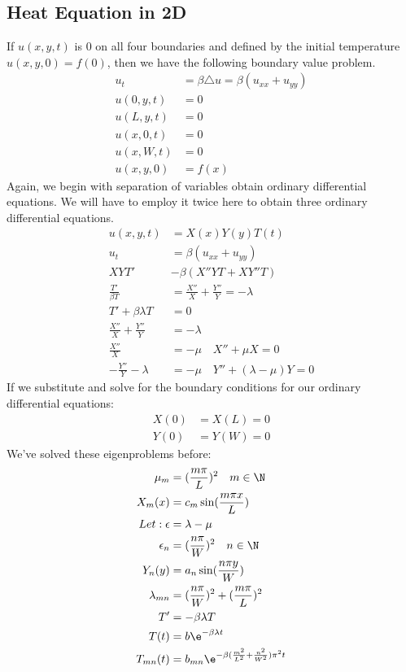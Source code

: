 \documentclass{math}
\begin{document}
\subsection*{Heat Equation in 2D}
\begin{center}
\end{center}
If \( u(x,y,t) \) is 0 on all four boundaries and defined by the initial
temperature \( u(x,y,0) = f(0) \), then we have the following boundary
value problem.
\begin{align*}
  u_t &= \beta\triangle u = \beta(u_{xx}+u_{yy}) \\
  u(0,y,t) &= 0 \\
  u(L,y,t) &= 0 \\
  u(x,0,t) &= 0 \\
  u(x,W,t) &= 0 \\
  u(x,y,0) &= f(x)
\end{align*}
Again, we begin with separation of variables obtain ordinary differential
equations. We will have to employ it twice here to obtain three ordinary
differential equations.
\begin{align*}
  u(x,y,t) &= X(x)Y(y)T(t) \\
  u_t &= \beta(u_{xx}+u_{yy}) \\
  XYT' &- \beta(X''YT+XY''T) \\
  \frac{T'}{\beta T} &= \frac{X''}{X}+\frac{Y''}{Y} = -\lambda \\
  T'+\beta\lambda T &= 0 \\
  \frac{X''}{X}+\frac{Y''}{Y} &= -\lambda \\
  \frac{X''}{X} &= -\mu \quad X''+\mu X = 0 \\
  -\frac{Y''}{Y}-\lambda &= -\mu \quad Y''+(\lambda-\mu)Y = 0
\end{align*}
If we substitute and solve for the boundary conditions for our ordinary
differential equations:
\begin{align*}
  X(0) &= X(L) = 0 \\
  Y(0) &= Y(W) = 0
\end{align*}
We've solved these eigenproblems before:
\begin{align*}
  \mu_m &= (\frac{m\pi}{L})^2 \quad m\in\N \\
  X_m(x) &= c_m\sin(\frac{m\pi x}{L}) \\
  Let: \epsilon &= \lambda-\mu \\
  \epsilon_n &= (\frac{n\pi}{W})^2 \quad n\in\N \\
  Y_n(y) &= a_n\sin(\frac{n\pi y}{W}) \\
  \lambda_{mn} &= (\frac{n\pi}{W})^2+(\frac{m\pi}{L})^2 \\
  T' &= -\beta\lambda T \\
  T(t) &= b\e^{-\beta\lambda t} \\
  T_{mn}(t) &= b_{mn}\e^{-\beta(\frac{m^2}{L^2}+\frac{n^2}{W^2})\pi^2t}
\end{align*}
\end{document}
